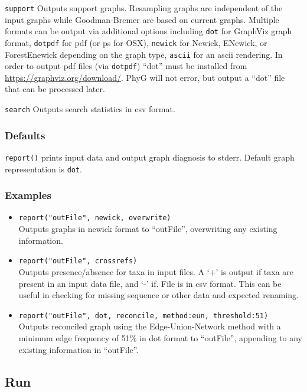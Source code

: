 \documentclass[11pt]{article}
\begin{document}
				\smallskip
				\noindent \texttt{support} Outputs  support graphs.  Resampling graphs are independent 
					of the input graphs while Goodman-Bremer are based on current graphs.   Multiple formats can be output via additional options including  \texttt{dot} for GraphViz graph format, \texttt{dotpdf} for pdf (or ps for OSX), 
					\texttt{newick} for Newick, ENewick, or ForestEnewick depending on the graph type, \texttt{ascii} for an ascii rendering.  In  order to output pdf files (via \texttt{dotpdf}) ``dot'' must be installed from \url{https://graphviz.org/download/}.  PhyG will not error, but output a ``dot'' file that can be processed later.
				
				\smallskip
				\noindent \texttt{search} Outputs search statistics in csv format.  
				
		\subsubsection{Defaults}
				\texttt{report()} prints input data and output graph diagnosis  to stderr.  Default graph representation is \texttt{dot}.
		\subsubsection{Examples}
				\begin{itemize}
					\item{\texttt{report("outFile", newick, overwrite)}\\ Outputs graphs in newick format to ``outFile'', overwriting any existing information.}
					\item{\texttt{report("outFile", crossrefs)}\\ Outputs presence/absence for taxa in input files.  A `+' is output  if taxa are present in an input data file, 
					and `-' if. File is in csv format.  This can be useful in checking for missing sequence or other data and expected renaming.}
					\item{\texttt{report("outFile", dot, reconcile, method:eun, threshold:51)}\\ Outputs reconciled graph using the Edge-Union-Network method with a minimum edge frequency of 51\% in dot format to ``outFile'', appending to any existing information in ``outFile''.}
				\end{itemize}
			
	\subsection{Run}
\end{document}

